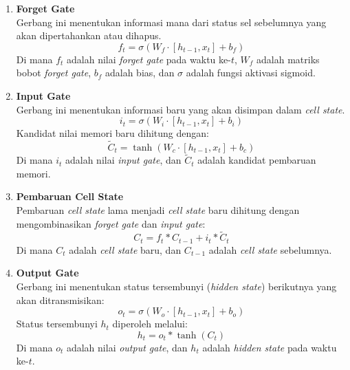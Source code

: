 \begin{enumerate}
    \item \textbf{Forget Gate} \\
    Gerbang ini menentukan informasi mana dari status sel sebelumnya yang akan dipertahankan atau dihapus.
    \begin{equation}
        f_t = \sigma(W_f \cdot [h_{t-1}, x_t] + b_f)
    \end{equation}
    Di mana $f_t$ adalah nilai \textit{forget gate} pada waktu ke-$t$, $W_f$ adalah matriks bobot \textit{forget gate}, $b_f$ adalah bias, dan $\sigma$ adalah fungsi aktivasi sigmoid.

    \item \textbf{Input Gate} \\
    Gerbang ini menentukan informasi baru yang akan disimpan dalam \textit{cell state}.
    \begin{equation}
        i_t = \sigma(W_i \cdot [h_{t-1}, x_t] + b_i)
    \end{equation}
    Kandidat nilai memori baru dihitung dengan:
    \begin{equation}
        \tilde{C}_t = \tanh(W_c \cdot [h_{t-1}, x_t] + b_c)
    \end{equation}
    Di mana $i_t$ adalah nilai \textit{input gate}, dan $\tilde{C}_t$ adalah kandidat pembaruan memori.

    \item \textbf{Pembaruan Cell State} \\
    Pembaruan \textit{cell state} lama menjadi \textit{cell state} baru dihitung dengan mengombinasikan \textit{forget gate} dan \textit{input gate}:
    \begin{equation}
        C_t = f_t * C_{t-1} + i_t * \tilde{C}_t
    \end{equation}
    Di mana $C_t$ adalah \textit{cell state} baru, dan $C_{t-1}$ adalah \textit{cell state} sebelumnya.

    \item \textbf{Output Gate} \\
    Gerbang ini menentukan status tersembunyi (\textit{hidden state}) berikutnya yang akan ditransmisikan:
    \begin{equation}
        o_t = \sigma(W_o \cdot [h_{t-1}, x_t] + b_o)
    \end{equation}
    Status tersembunyi $h_t$ diperoleh melalui:
    \begin{equation}
        h_t = o_t * \tanh(C_t)
    \end{equation}
    Di mana $o_t$ adalah nilai \textit{output gate}, dan $h_t$ adalah \textit{hidden state} pada waktu ke-$t$.
\end{enumerate}

